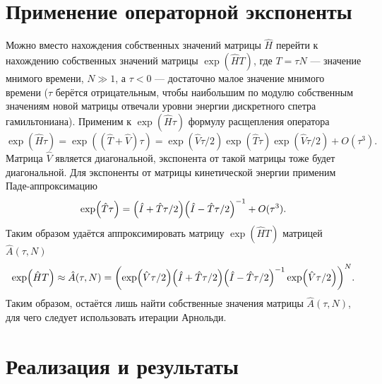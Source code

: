 \documentclass[11pt]{article}
\begin{document}
\section{Применение операторной экспоненты}

Можно вместо нахождения собственных значений матрицы $\hat H$ перейти к нахождению собственных значе\-ний матрицы $\exp(\hat H T)$, где $T = \tau N$ --- значение мнимого времени, $N\gg1$, а $\tau<0$ --- достаточно малое значение мнимого времени ($\tau$ берётся отрицательным, чтобы наибольшим по модулю собственным значениям новой матрицы отвечали уровни энергии дискретного спетра гамильтониана). Применим к $\exp(\hat H \tau)$ формулу расщепления оператора
\begin{equation}
 \exp(\hat H \tau) = \exp((\hat T + \hat V) \tau) = \exp(\hat V \tau/2) \exp(\hat T \tau) \exp(\hat V \tau/2) + O(\tau^3).
\end{equation}
Матрица $\hat V$ является диагональной, экспонента от такой матрицы тоже будет диагональной. Для экспонен\-ты от матрицы кинетической энергии применим Паде-аппроксимацию
\begin{equation}
 \exp(\hat T \tau) = \qty(\hat I + \hat T \tau/2) \qty(\hat I - \hat T \tau/2)^{-1} + O(\tau^3).
\end{equation}
Таким образом удаётся аппроксимировать матрицу $\exp(\hat H T)$ матрицей $\hat A(\tau, N)$
\begin{equation}
 \exp(\hat H T) \approx \hat A(\tau, N) = \qty(\exp(\hat V \tau/2) \qty(\hat I + \hat T \tau/2) \qty(\hat I - \hat T \tau/2)^{-1} \exp(\hat V \tau/2) )^N.
\end{equation}
Таким образом, остаётся лишь найти собственные значения матрицы $\hat A(\tau, N)$, для чего следует использо\-вать итерации Арнольди.

\section{Реализация и результаты}
\end{document}
